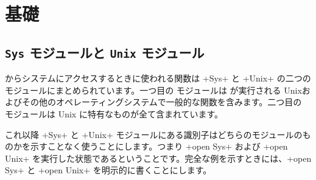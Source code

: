 %
%

\chapter{{基礎}}

\section{{\normalfont\texttt{Sys}} モジュールと {\normalfont\texttt{Unix} モジュール}}

\ocaml からシステムにアクセスするときに使われる関数は \ml+Sys+ と \ml+Unix+ の二つのモジュールにまとめられています。一つ目の  モジュールは \ocaml が実行される Unixおよびその他のオペレーティングシステムで一般的な関数を含みます。二つ目の  モジュールは Unix に特有なものが全て含まれています。

これ以降 \ml+Sys+ と \ml+Unix+ モジュールにある識別子はどちらのモジュールのものかを示すことなく使うことにします。つまり \ml+open Sys+ および \ml+open Unix+ を実行した状態であるということです。完全な例を示すときには、\ml+open Sys+ と \ml+open Unix+ を明示的に書くことにします。

